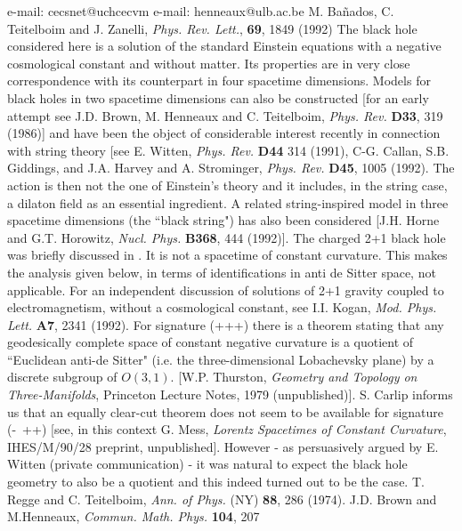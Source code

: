 \begin{thebibliography}{20}
\bibitem[*]{} e-mail: cecsnet@uchcecvm
\bibitem[\#]{} e-mail: henneaux@ulb.ac.be
M. Ba\~nados, C. Teitelboim and J. Zanelli, {\it Phys. Rev. Lett.},
 {\bf 69}, 1849 (1992)
The black hole considered here is a solution of the standard
Einstein
 equations with a negative cosmological constant and without matter. Its
 properties are in very close correspondence with its counterpart in four
 spacetime dimensions. Models for black holes in two spacetime dimensions can
 also be constructed [for an early attempt see J.D. Brown, M. Henneaux and C.
 Teitelboim, {\it Phys. Rev.} {\bf D33}, 319 (1986)] and have been the
object of
 considerable interest recently in connection with string theory
[see E. Witten,
 {\it Phys. Rev.} {\bf D44} 314 (1991), C-G. Callan, S.B. Giddings, and J.A.
 Harvey and A. Strominger, {\it Phys. Rev.} {\bf D45}, 1005 (1992). The action
 is then not the one of Einstein's theory and it includes, in the string
case, a
 dilaton field as an essential ingredient. A related string-inspired model in
 three spacetime dimensions (the ``black string") has also been considered
[J.H. Horne and G.T. Horowitz, {\it Nucl. Phys.} {\bf B368}, 444 (1992)].
The charged 2+1 black hole was briefly discussed in \cite{1}. It is
not a
 spacetime of constant curvature. This makes the analysis given below, in
terms
 of identifications in anti de Sitter space, not applicable. For an
independent
 discussion of solutions of 2+1 gravity coupled to electromagnetism, without a
 cosmological constant, see I.I. Kogan, {\it Mod. Phys. Lett.} {\bf A7}, 2341
 (1992).
For signature (+++) there is a theorem stating that any
geodesically
 complete space of constant negative curvature is a quotient of ``Euclidean
 anti-de Sitter" (i.e. the three-dimensional Lobachevsky plane) by a discrete
 subgroup of $O (3,1)$. [W.P. Thurston, {\it Geometry and Topology on
 Three-Manifolds}, Princeton Lecture Notes, 1979 (unpublished)]. S. Carlip
 informs us that an equally clear-cut theorem does not seem to be available
for
 signature (-\ ++) [see, in this context G. Mess, {\it Lorentz Spacetimes of
 Constant Curvature}, IHES/M/90/28 preprint, unpublished]. However - as
 persuasively argued by E. Witten (private communication) - it was natural to
 expect the black hole geometry to also be a quotient and this indeed turned
out to be the case.
T. Regge and C. Teitelboim, {\it Ann. of Phys.} (NY) {\bf 88}, 286
 (1974).
J.D. Brown and M.Henneaux, {\it Commun. Math. Phys.} {\bf 104}, 207

\end{thebibliography}
